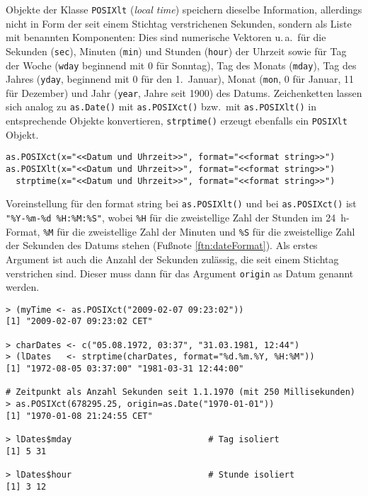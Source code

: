Objekte der Klasse \lstinline!POSIXlt! (\emph{local time}) speichern dieselbe Information, allerdings nicht in Form der seit einem Stichtag verstrichenen Sekunden, sondern als Liste mit benannten Komponenten: Dies sind numerische Vektoren u.\,a.\ für die Sekunden (\lstinline!sec!), Minuten (\lstinline!min!) und Stunden (\lstinline!hour!) der Uhrzeit sowie für Tag der Woche (\lstinline!wday! beginnend mit 0 für Sonntag), Tag des Monats (\lstinline!mday!), Tag des Jahres (\lstinline!yday!, beginnend mit 0 für den 1.\ Januar), Monat (\lstinline!mon!, 0 für Januar, 11 für Dezember) und Jahr (\lstinline!year!, Jahre seit 1900) des Datums. Zeichenketten lassen sich analog zu \lstinline!as.Date()! mit \lstinline!as.POSIXct()! bzw.\ mit \lstinline!as.POSIXlt()! in entsprechende Objekte konvertieren, \lstinline!strptime()! erzeugt ebenfalls ein \lstinline!POSIXlt! Objekt.
\begin{lstlisting}
as.POSIXct(x="<<Datum und Uhrzeit>>", format="<<format string>>")
as.POSIXlt(x="<<Datum und Uhrzeit>>", format="<<format string>>")
  strptime(x="<<Datum und Uhrzeit>>", format="<<format string>>")
\end{lstlisting}

Voreinstellung für den format string bei \lstinline!as.POSIXlt()! und bei \lstinline!as.POSIXct()! ist \lstinline!"%Y-%m-%d %H:%M:%S"!, wobei \lstinline!%H! für die zweistellige Zahl der Stunden im 24~h-Format, \lstinline!%M! für die zweistellige Zahl der Minuten und \lstinline!%S! für die zweistellige Zahl der Sekunden des Datums stehen (Fußnote \ref{ftn:dateFormat}). Als erstes Argument ist auch die Anzahl der Sekunden zulässig, die seit einem Stichtag verstrichen sind. Dieser muss dann für das Argument \lstinline!origin! as Datum genannt werden.
\begin{lstlisting}
> (myTime <- as.POSIXct("2009-02-07 09:23:02"))
[1] "2009-02-07 09:23:02 CET"

> charDates <- c("05.08.1972, 03:37", "31.03.1981, 12:44")
> (lDates   <- strptime(charDates, format="%d.%m.%Y, %H:%M"))
[1] "1972-08-05 03:37:00" "1981-03-31 12:44:00"

# Zeitpunkt als Anzahl Sekunden seit 1.1.1970 (mit 250 Millisekunden)
> as.POSIXct(678295.25, origin=as.Date("1970-01-01"))
[1] "1970-01-08 21:24:55 CET"

> lDates$mday                           # Tag isoliert
[1] 5 31

> lDates$hour                           # Stunde isoliert
[1] 3 12
\end{lstlisting}

